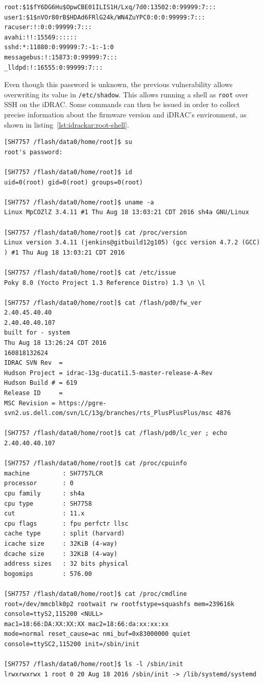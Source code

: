 \begin{lstlisting}[language={},caption={original \texttt{/etc/shadow} from iDRAC firmware.},label={lst:idrackar:original-shadow}]
root:$1$fY6DG6Hu$OpwCBE01ILIS1H/Lxq/7d0:13502:0:99999:7:::
user1:$1$nVOr80rB$HDAd6FRlG24k/WN4ZuYPC0:0:0:99999:7:::
racuser:!:0:0:99999:7:::
avahi:!!:15569::::::
sshd:*:11880:0:99999:7:-1:-1:0
messagebus:!:15873:0:99999:7:::
_lldpd:!:16555:0:99999:7:::
\end{lstlisting}

Even though this password is unknown, the previous vulnerability allows overwriting its value in \texttt{/etc/shadow}.
This allows running a shell as \texttt{root} over SSH on the iDRAC.
Some commands can then be issued in order to collect precise information about the firmware version and iDRAC's environment, as shown in listing~\ref{lst:idrackar:root-shell}.

\begin{lstlisting}[language={},caption={some commands from a root shell on iDRAC 8.},label={lst:idrackar:root-shell}]
[SH7757 /flash/data0/home/root]$ su
root's password:

[SH7757 /flash/data0/home/root]$ id
uid=0(root) gid=0(root) groups=0(root)

[SH7757 /flash/data0/home/root]$ uname -a
Linux MpCOZlZ 3.4.11 #1 Thu Aug 18 13:03:21 CDT 2016 sh4a GNU/Linux

[SH7757 /flash/data0/home/root]$ cat /proc/version 
Linux version 3.4.11 (jenkins@gitbuild12g105) (gcc version 4.7.2 (GCC) ) #1 Thu Aug 18 13:03:21 CDT 2016

[SH7757 /flash/data0/home/root]$ cat /etc/issue
Poky 8.0 (Yocto Project 1.3 Reference Distro) 1.3 \n \l

[SH7757 /flash/data0/home/root]$ cat /flash/pd0/fw_ver
2.40.45.40.40
2.40.40.40.107
built for - system
Thu Aug 18 13:26:24 CDT 2016
160818132624
IDRAC SVN Rev  = 
Hudson Project = idrac-13g-ducati1.5-master-release-A-Rev
Hudson Build # = 619
Release ID     = 
MSC Revision = https://pgre-svn2.us.dell.com/svn/LC/13g/branches/rts_PlusPlusPlus/msc 4876

[SH7757 /flash/data0/home/root]$ cat /flash/pd0/lc_ver ; echo
2.40.40.40.107

[SH7757 /flash/data0/home/root]$ cat /proc/cpuinfo
machine         : SH7757LCR
processor       : 0
cpu family      : sh4a
cpu type        : SH7758
cut             : 11.x
cpu flags       : fpu perfctr llsc
cache type      : split (harvard)
icache size     : 32KiB (4-way)
dcache size     : 32KiB (4-way)
address sizes   : 32 bits physical
bogomips        : 576.00

[SH7757 /flash/data0/home/root]$ cat /proc/cmdline
root=/dev/mmcblk0p2 rootwait rw rootfstype=squashfs mem=239616k
console=ttyS2,115200 <NULL>
mac1=18:66:DA:XX:XX:XX mac2=18:66:da:xx:xx:xx
mode=normal reset_cause=ac nmi_buf=0x83000000 quiet
console=ttySC2,115200 init=/sbin/init

[SH7757 /flash/data0/home/root]$ ls -l /sbin/init
lrwxrwxrwx 1 root 0 20 Aug 18 2016 /sbin/init -> /lib/systemd/systemd
\end{lstlisting}

